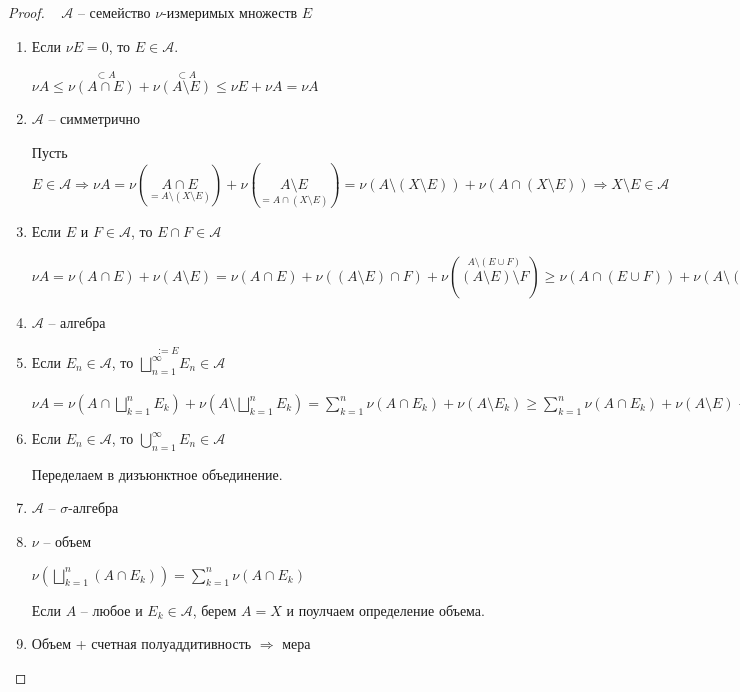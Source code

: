 \begin{proof}~
    $\mathcal{A}$ – семейство $\nu$-измеримых множеств $E$

    \begin{enumerate}
        \item Если $\nu E=0$, то $E\in \mathcal{A}$.
        
        $\nu A \leq \nu \overset{\subset A}{(A\cap E)}+\nu \overset{\subset A}{(A\setminus E)}\leq \nu E + \nu A = \nu A$

        \item $\mathcal{A}$ – симметрично
        
        Пусть $E\in \mathcal{A}\Rightarrow \nu A = \nu (\underset{=A\setminus(X\setminus E)}{A\cap E})+\nu (\underset{=A\cap(X\setminus E)}{A\setminus E})=
        \nu (A\setminus(X\setminus E))+\nu (A\cap(X\setminus E))\Rightarrow X\setminus E\in \mathcal{A}$

        \item Если $E$ и $F\in \mathcal{A}$, то $E\cap F \in \mathcal{A}$
        
        $\nu A = \nu (A\cap E)+\nu (A\setminus E)= \nu (A\cap E)+\nu ((A\setminus E)\cap F)+\nu (\overset{A\setminus (E\cup F)}{(A\setminus E)\setminus F})\geq 
        \nu (A\cap(E\cup F))+\nu (A\setminus (E\cup F))$

        \item $\mathcal{A}$ – алгебра
        \item Если $E_n\in \mathcal{A}$, то $\overset{:=E}{\bigsqcup\limits_{n=1}^\infty E_n}\in \mathcal{A}$
        
        $\nu A=\nu (A\cap \bigsqcup\limits_{k=1}^n E_k)+\nu (A\setminus \bigsqcup\limits_{k=1}^n E_k)=
        \sum \limits_{k=1}^n \nu(A\cap E_k) + \nu (A\setminus E_k)\geq
        \sum \limits_{k=1}^n \nu(A\cap E_k) + \nu (A\setminus E)\rightarrow
        \sum \limits_{k=1}^\infty \nu(A\cap E_k) + \nu (A\setminus E)\overset{\text{счут. полуад.}}{\geq} \nu (A\cap E) + \nu (A\setminus E)$

        \item Если $E_n\in \mathcal{A}$, то $\bigcup\limits_{n=1}^\infty E_n\in \mathcal{A}$
        
        Переделаем в дизъюнктное объединение.

        \item $\mathcal{A}$ – $\sigma$-алгебра
        \item $\nu$ – объем
        
        $\nu(\bigsqcup\limits_{k=1}^n (A\cap E_k))=\sum\limits_{k=1}^n \nu(A\cap E_k)$

        Если $A$ –  любое и $E_k\in \mathcal{A}$, берем $A=X$ и поулчаем определение объема.

        \item Объем + счетная полуаддитивность $\Rightarrow$ мера
    \end{enumerate}
\end{proof}

